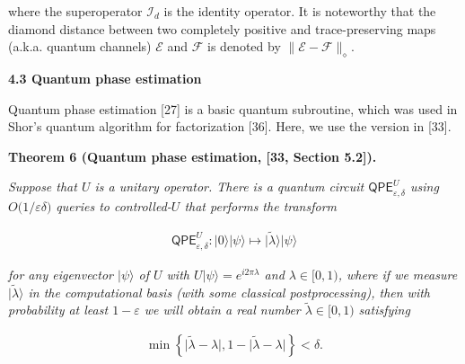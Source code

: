 \documentclass[10pt,a4paper]{article}
\begin{document}
where the superoperator $\mathcal{I}_{d}$ is the identity operator.
It is noteworthy that the diamond distance between two completely positive and trace-preserving maps (a.k.a. quantum channels) $\mathcal{E}$ and $\mathcal{F}$ is denoted by $\lVert\mathcal{E}-\mathcal{F}\rVert_{\diamond}$.\par





\par\medskip\noindent\textbf{
4.3 Quantum phase estimation}\par




Quantum phase estimation [27] is a basic quantum subroutine, which was used in Shor’s quantum algorithm for factorization [36].
Here, we use the version in [33].\par





\par\medskip\noindent\textbf{
\textbf{Theorem 6}\textbf{ }(Quantum phase estimation, [33, Section 5.2])\textbf{.}
}\par



\emph{Suppose that $U$ is a unitary operator.
There is a quantum circuit $\mathsf{QPE}^{U}_{\varepsilon,\delta}$ using $O\lparen 1/\varepsilon\delta\rparen$ queries to controlled-$U$ that performs the transform}\par


\[\begin{gathered}
\mathsf{QPE}^{U}_{\varepsilon,\delta}\colon\lvert 0\rangle\lvert\psi\rangle\mapsto\lvert\tilde{\lambda}\rangle\lvert\psi\rangle
\end{gathered}\]


\emph{for any eigenvector $\lvert\psi\rangle$ of $U$ with $U\lvert\psi\rangle=e^{i2\pi\lambda}$ and $\lambda\in[0,1)$,
where if we measure $\lvert\tilde{\lambda}\rangle$ in the computational basis (with some classical postprocessing), then with probability at least $1-\varepsilon$ we will obtain a real number $\tilde{\lambda}\in[0,1)$ satisfying}\par


\[\begin{gathered}
\min\left\{\lvert\tilde{\lambda}-\lambda\rvert,1-\lvert\tilde{\lambda}-\lambda\rvert\right\}<\delta.
\end{gathered}\]
\end{document}
